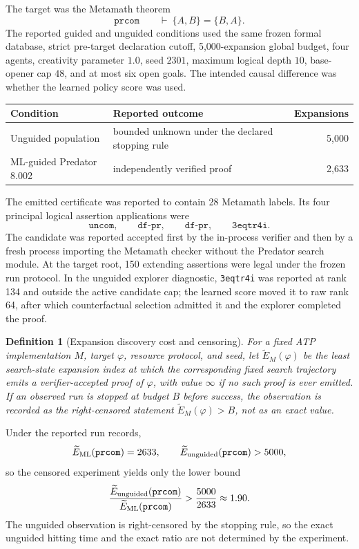 \documentclass[11pt]{article}
\newtheorem{definition}{Definition}[section]
\theoremstyle{remark}
\begin{document}
The target was the Metamath theorem
\[
\texttt{prcom}\qquad \vdash\ \{A,B\}=\{B,A\}.
\]
The reported guided and unguided conditions used the same frozen formal database, strict pre-target declaration cutoff, 5,000-expansion global budget, four agents, creativity parameter $1.0$, seed $2301$, maximum logical depth $10$, base-opener cap $48$, and at most six open goals. The intended causal difference was whether the learned policy score was used.

\begin{center}
\begin{tabular}{p{}p{}r}
\toprule
\textbf{Condition} & \textbf{Reported outcome} & \textbf{Expansions}\\
\midrule
Unguided population & bounded unknown under the declared stopping rule & 5,000\\
ML-guided Predator 8.002 & independently verified proof & 2,633\\
\bottomrule
\end{tabular}
\end{center}

The emitted certificate was reported to contain 28 Metamath labels. Its four principal logical assertion applications were
\[
\texttt{uncom},\qquad \texttt{df-pr},\qquad \texttt{df-pr},\qquad \texttt{3eqtr4i}.
\]
The candidate was reported accepted first by the in-process verifier and then by a fresh process importing the Metamath checker without the Predator search module. At the target root, 150 extending assertions were legal under the frozen run protocol. In the unguided explorer diagnostic, \texttt{3eqtr4i} was reported at rank 134 and outside the active candidate cap; the learned score moved it to raw rank 64, after which counterfactual selection admitted it and the explorer completed the proof.

\begin{definition}[Expansion discovery cost and censoring]
For a fixed ATP implementation $M$, target $\varphi$, resource protocol, and seed, let
$\widetilde E_M(\varphi)$ be the least search-state expansion index at which the corresponding fixed search trajectory emits a verifier-accepted proof of $\varphi$, with value $\infty$ if no such proof is ever emitted. If an observed run is stopped at budget $B$ before success, the observation is recorded as the right-censored statement
$\widetilde E_M(\varphi)>B$, not as an exact value.
\end{definition}

Under the reported run records,
\[
\widetilde E_{\rm ML}(\texttt{prcom})=2633,
\qquad
\widetilde E_{\rm unguided}(\texttt{prcom})>5000,
\]
so the censored experiment yields only the lower bound
\[
\frac{\widetilde E_{\rm unguided}(\texttt{prcom})}
{\widetilde E_{\rm ML}(\texttt{prcom})}
>
\frac{5000}{2633}
\approx1.90.
\]
The unguided observation is right-censored by the stopping rule, so the exact unguided hitting time and the exact ratio are not determined by the experiment.
\end{document}
